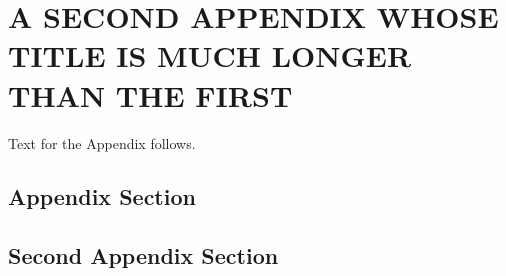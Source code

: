 %
%
%
%


\chapter{\uppercase {A Second Appendix Whose Title Is Much Longer Than The First}}

Text for the Appendix follows.

\section{Appendix Section}

\section{Second Appendix Section}


\pagebreak{}